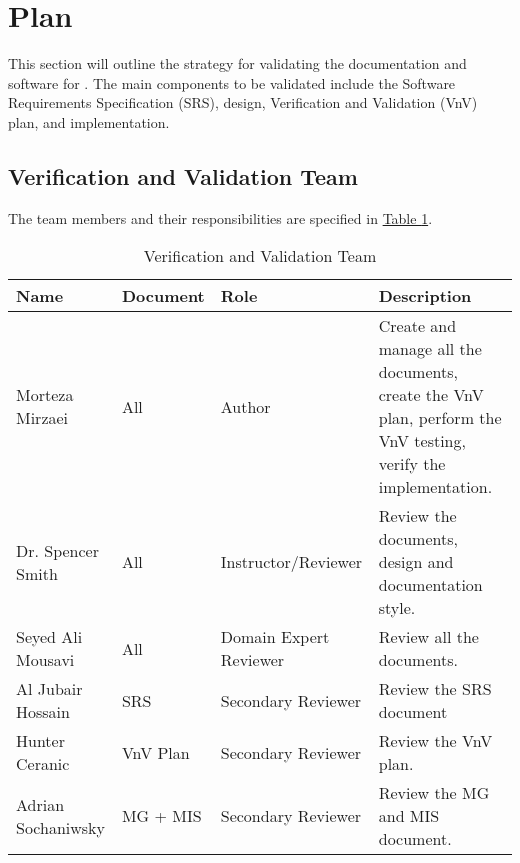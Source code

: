 \documentclass[12pt, titlepage]{article}
\begin{document}


\section{Plan}

This section will outline the strategy for validating the documentation
and software for \progname{}. The main components to be validated
include the Software Requirements Specification (SRS), design,
Verification and Validation (VnV) plan, and implementation.



\subsection{Verification and Validation Team}

The team members and their responsibilities are specified in \hyperref[team]{Table \ref*{team}}.

\begin{table}[!h]
  \caption{Verification and Validation Team} \label{team}
  \vspace*{3mm}
  \begin{tabular}{|p{}|p{}|p{}|p{}|}
    \hline
    \textbf{Name}      & \textbf{Document} & \textbf{Role}          & \textbf{Description}                                                                                          \\
    \hline
    Morteza Mirzaei    & All               & Author                 & Create and manage all the documents, create the VnV plan, perform the VnV testing, verify the implementation. \\
    \hline
    Dr. Spencer Smith  & All               & Instructor/Reviewer    & Review the documents, design and documentation style.                                                         \\
    \hline
    Seyed Ali Mousavi  & All               & Domain Expert Reviewer & Review all the documents.                                                                                     \\
    \hline
    Al Jubair Hossain  & SRS               & Secondary Reviewer     & Review the SRS document                                                                                       \\
    \hline
    Hunter Ceranic     & VnV Plan          & Secondary Reviewer     & Review the VnV plan.                                                                                          \\
    \hline
    Adrian Sochaniwsky & MG + MIS          & Secondary Reviewer     & Review the MG and MIS document.                                                                               \\
    \hline
  \end{tabular}
\end{table}
\end{document}
